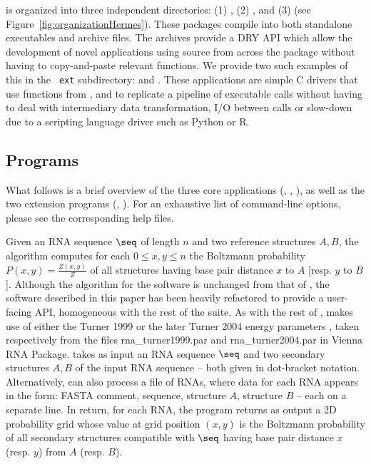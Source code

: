 \Hermes is organized into three independent directories: (1)
\FFTborTwoD, (2) \RNAmfpt, and (3) \RNAeq (see
Figure~\ref{fig:organizationHermes}). These packages compile into both
standalone executables and archive files. The archives provide a DRY
API which allow the development of novel applications using source
from across the \Hermes package without having to copy-and-paste
relevant functions. We provide two such examples of this in the {\tt
ext} subdirectory: \FFTmfpt and \FFTeq. These applications
are simple C drivers that use functions from \FFTborTwoD, \RNAmfpt and
\RNAeq to replicate a pipeline of executable calls without having to
deal with intermediary data transformation, I/O between calls or
slow-down due to a scripting language driver such as Python or R.

\subsection{Programs}

What follows is a brief overview of the three core applications
(\FFTborTwoD, \RNAmfpt, \RNAeq), as well as the two extension
programs (\FFTmfpt, \FFTeq). For an exhaustive list of
command-line options, please see the corresponding help files.

Given an RNA sequence $\seq$ of length $n$ and two reference
structures $A,B$, the algorithm \FFTborTwoD \cite{Senter.jmb14}
computes for each $0 \leq x,y \leq n$ the Boltzmann probability
$P(x,y) = \frac{Z(x,y)}{Z}$ of all structures having base pair
distance $x$ to $A$ [resp. $y$ to $B$]. Although the algorithm for the
software \FFTborTwoD is unchanged from that of \cite{Senter.jmb14},
the software described in this
paper has been heavily refactored to provide a user-facing API,
homogeneous with the rest of the \Hermes suite. As with the rest of
\Hermes, \FFTborTwoD makes use of either the Turner 1999 \cite{turner}
or the later Turner 2004 energy parameters
\cite{Turner.nar10}, taken respectively
from the files rna\_turner1999.par and  rna\_turner2004.par in Vienna
RNA Package. \FFTborTwoD takes as input an RNA sequence $\seq$ and two
secondary structures $A,B$ of the input RNA sequence -- both given
in dot-bracket
notation. Alternatively, \FFTborTwoD can also process a file of RNAs,
where data for each RNA appears in the form: FASTA comment, sequence,
structure $A$, structure $B$ -- each on a separate line. In return,
for each RNA, the program returns as output a 2D probability grid
whose value at
grid position $(x,y)$ is the Boltzmann probability of all secondary
structures compatible with $\seq$ having base pair distance $x$ (resp.
$y$) from $A$ (resp. $B$).

